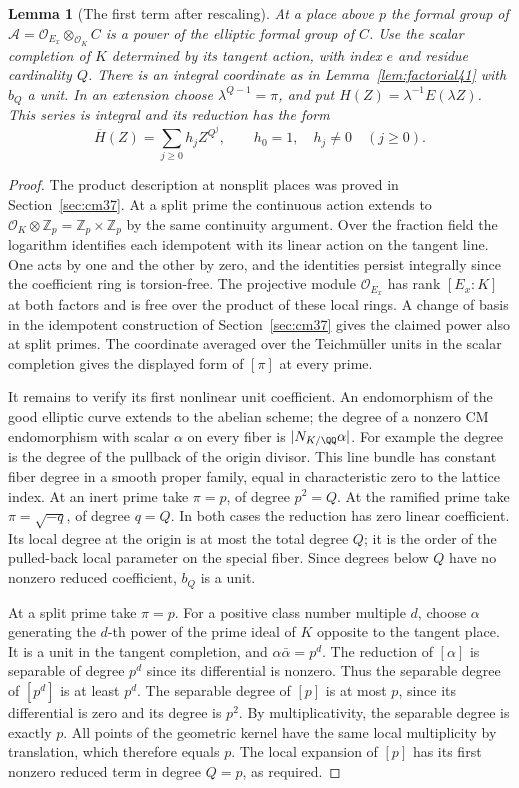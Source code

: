\documentclass[a4paper,11pt]{article}
\newtheorem{lemma}[proposition]{Lemma}
\theoremstyle{definition}
\theoremstyle{remark}
\newcommand{\ZZ}{\mathbb Z}\newcommand{\ord}{\operatorname{ord}}
\numberwithin{equation}{section}
\newcommand{\OO}{\mathcal O}
\begin{document}
\begin{lemma}[The first term after rescaling]\label{lem:unit41}
At a place above \(p\) the formal group of \(\mathcal A=\OO_{E_x}\otimes_{\OO_K} C\) is a power of the elliptic formal group of \(C\). Use the scalar completion of \(K\) determined by its tangent action, with index \(e\) and residue cardinality \(Q\). There is an integral coordinate as in Lemma~\ref{lem:factorial41} with \(b_Q\) a unit. In an extension choose \(\lambda^{Q-1}=\pi\), and put \(H(Z)=\lambda^{-1}E(\lambda Z)\). This series is integral and its reduction has the form
\[
                    \overline H(Z)=\sum_{j\ge0} h_j Z^{Q^j},
                \qquad h_0=1,\quad h_j\ne0\quad(j\ge0).
\]
\end{lemma}
\begin{proof}
The product description at nonsplit places was proved in Section~\ref{sec:cm37}. At a split prime the continuous action extends to \(\OO_K\otimes\ZZ_p=\ZZ_p\times\ZZ_p\) by the same continuity argument. Over the fraction field the logarithm identifies each idempotent with its linear action on the tangent line. One acts by one and the other by zero, and the identities persist integrally since the coefficient ring is torsion-free. The projective module \(\OO_{E_x}\) has rank \([E_x:K]\) at both factors and is free over the product of these local rings. A change of basis in the idempotent construction of Section~\ref{sec:cm37} gives the claimed power also at split primes. The coordinate averaged over the Teichm\"uller units in the scalar completion gives the displayed form of \([\pi]\) at every prime.

It remains to verify its first nonlinear unit coefficient. An endomorphism of the good elliptic curve extends to the abelian scheme; the degree of a nonzero CM endomorphism with scalar \(\alpha\) on every fiber is \(|N_{K/\QQ}\alpha|\). For example the degree is the degree of the pullback of the origin divisor. This line bundle has constant fiber degree in a smooth proper family, equal in characteristic zero to the lattice index. At an inert prime take \(\pi=p\), of degree \(p^2=Q\). At the ramified prime take \(\pi=\sqrt{-q}\), of degree \(q=Q\). In both cases the reduction has zero linear coefficient. Its local degree at the origin is at most the total degree \(Q\); it is the order of the pulled-back local parameter on the special fiber. Since degrees below \(Q\) have no nonzero reduced coefficient, \(b_Q\) is a unit.

At a split prime take \(\pi=p\). For a positive class number multiple \(d\), choose \(\alpha\) generating the \(d\)-th power of the prime ideal of \(K\) opposite to the tangent place. It is a unit in the tangent completion, and \(\alpha\bar\alpha=p^d\). The reduction of \([\alpha]\) is separable of degree \(p^d\) since its differential is nonzero. Thus the separable degree of \([p^d]\) is at least \(p^d\). The separable degree of \([p]\) is at most \(p\), since its differential is zero and its degree is \(p^2\). By multiplicativity, the separable degree is exactly \(p\). All points of the geometric kernel have the same local multiplicity by translation, which therefore equals \(p\). The local expansion of \([p]\) has its first nonzero reduced term in degree \(Q=p\), as required.


\end{proof}
\end{document}
